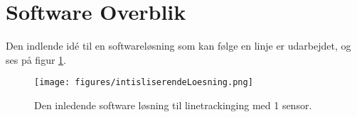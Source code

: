 \section{Software Overblik}
Den indlende idé til en softwareløsning som kan følge en linje er udarbejdet, og ses på figur \ref{init_software}.

\begin{figure}[h!]
  \centering
  \texttt{[image: figures/intisliserendeLoesning.png]}
  \caption{Den inledende software løsning til linetrackinging med 1 sensor.}
  \label{init_software}
\end{figure}


